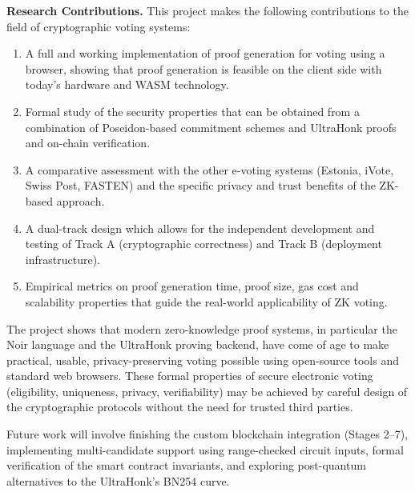 \documentclass[12pt, a4paper]{report}
\begin{document}
\textbf{Research Contributions.} This project makes the following contributions to the field of cryptographic voting systems:
\begin{enumerate}
    \item A full and working implementation of proof generation for voting using a browser, showing that proof generation is feasible on the client side with today's hardware and WASM technology.
    \item Formal study of the security properties that can be obtained from a combination of Poseidon-based commitment schemes and UltraHonk proofs and on-chain verification.
    \item A comparative assessment with the other e-voting systems (Estonia, iVote, Swiss Post, FASTEN) and the specific privacy and trust benefits of the ZK-based approach.
    \item A dual-track design which allows for the independent development and testing of Track A (cryptographic correctness) and Track B (deployment infrastructure).
    \item Empirical metrics on proof generation time, proof size, gas cost and scalability properties that guide the real-world applicability of ZK voting.
\end{enumerate}

The project shows that modern zero-knowledge proof systems, in particular the Noir language \cite{noir2024docs} and the UltraHonk proving backend, have come of age to make practical, usable, privacy-preserving voting possible using open-source tools and standard web browsers. These formal properties of secure electronic voting (eligibility, uniqueness, privacy, verifiability) may be achieved by careful design of the cryptographic protocols without the need for trusted third parties.

Future work will involve finishing the custom blockchain integration (Stages 2--7), implementing multi-candidate support using range-checked circuit inputs, formal verification of the smart contract invariants, and exploring post-quantum alternatives to the UltraHonk's BN254 curve.

\renewcommand{\bibname}{References}


\end{document}
